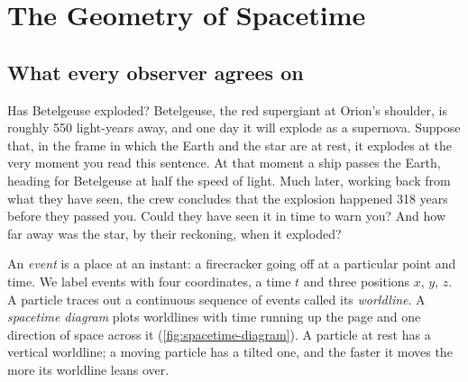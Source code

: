 \chapter{The Geometry of Spacetime}\label{ch:geometry}

\section{What every observer agrees on}\label{sec:interval}

\begin{thought}{Has Betelgeuse exploded?}
Betelgeuse, the red supergiant at Orion's shoulder, is roughly 550 light-years
away, and one day it will explode as a supernova. Suppose that, in the frame
in which the Earth and the star are at rest, it explodes at the very moment you
read this sentence. At that moment a ship passes the Earth, heading for
Betelgeuse at half the speed of light. Much later, working back from what they
have seen, the crew concludes that the explosion happened 318 years before
they passed you. Could they have seen it in time to warn you? And how far away
was the star, by their reckoning, when it exploded?
\end{thought}

An \emph{event} is a place at an instant: a firecracker going off at a
particular point and time. We label events with four coordinates, a time $t$
and three positions $x$, $y$, $z$. A particle traces out a continuous sequence
of events called its \emph{worldline}. A \emph{spacetime diagram} plots
worldlines with time running up the page and one direction of space across it
(\cref{fig:spacetime-diagram}). A particle at rest has a vertical worldline; a
moving particle has a tilted one, and the faster it moves the more its
worldline leans over.

